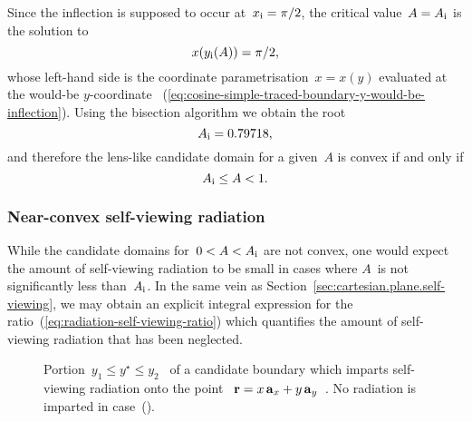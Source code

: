 Since the inflection is supposed to occur at~$x_{\mathrm{i}} = \pi/2$,
the critical value~$A = A_{\mathrm{i}}$ is the solution to
\begin{equation}
  x \roundbr[\bulkysize]{y_\infl (A)} = \pi/2,
  \label{eq:cosine-simple-traced-boundary-a-inflection-equation}
\end{equation}
whose left-hand side is the coordinate parametrisation~$x = x (y)$
evaluated at the would-be $y$-coordinate~%
  (\ref{eq:cosine-simple-traced-boundary-y-would-be-inflection}).
Using the bisection algorithm we obtain the root
\begin{equation}
  A_{\mathrm{i}} = 0.79718,
  \label{eq:cosine-simple-traced-boundary-a-inflection}
\end{equation}
and therefore the lens-like candidate domain for a given~$A$ is convex
if and only if
\begin{equation}
  A_{\mathrm{i}} \le A < 1.
  \label{eq:cosine-simple-traced-boundary-convex-a-interval}
\end{equation}

\subsubsection{Near-convex self-viewing radiation}
\label{sec:cartesian.cosine.simple.self-viewing}

While the candidate domains for~$0 < A < A_{\mathrm{i}}$ are not convex,
one would expect the amount of self-viewing radiation to be small
in cases where $A$~is not significantly less than~$A_{\mathrm{i}}$.
In the same vein as Section~\ref{sec:cartesian.plane.self-viewing},
we may obtain an explicit integral expression
for the ratio~(\ref{eq:radiation-self-viewing-ratio})
which quantifies the amount of self-viewing radiation
that has been neglected.

\begin{figure}
  \newcommand*{\subfigurewidth}{0.325\textwidth}
  \centering
  \begin{subfigure}{\subfigurewidth}
  \end{subfigure}
  \hfill
  \begin{subfigure}{\subfigurewidth}
  \end{subfigure}
  \hfill
  \begin{subfigure}{\subfigurewidth}
  \end{subfigure}
  \caption{
    Portion~$y_1 \le y^\star \le y_2$~
    of a candidate boundary
    which imparts self-viewing radiation onto the point~%
    $\boldsymbol{\mathbf{r}} = x \mathop{}\!\boldsymbol{\mathbf{a}}_{x} + y \mathop{}\!\boldsymbol{\mathbf{a}}_{y}$~.
    No radiation is imparted
    in case~().
  }
  \label{fig:cosine_simple-self-viewing-bounds}
\end{figure}

